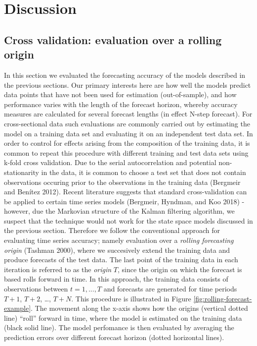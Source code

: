 \documentclass[]{article}
\begin{document}
\section{Discussion}\label{discussion}

\subsection{Cross validation: evaluation over a rolling
origin}\label{cross-validation-evaluation-over-a-rolling-origin}

In this section we evaluated the forecasting accuracy of the models
described in the previous sections. Our primary interests here are how
well the models predict data points that have not been used for
estimation (out-of-sample), and how performance varies with the length
of the forecast horizon, whereby accuracy measures are calculated for
several forecast lengths (in effect N-step forecast). For
cross-sectional data such evaluations are commonly carried out by
estimating the model on a training data set and evaluating it on an
independent test data set. In order to control for effects arising from
the composition of the training data, it is common to repeat this
procedure with different training and test data sets using k-fold cross
validation. Due to the serial autocorrelation and potential
non-stationarity in the data, it is common to choose a test set that
does not contain observations occuring prior to the observations in the
training data (Bergmeir and Benítez 2012). Recent literature suggests
that standard cross-validation can be applied to certain time series
models (Bergmeir, Hyndman, and Koo 2018) - however, due the Markovian
structure of the Kalman filtering algorithm, we suspect that the
technique would not work for the state space models discussed in the
previous section. Therefore we follow the conventional approach for
evaluating time series accuracy; namely evaluation over a
\textit{rolling forecasting origin} (Tashman 2000), where we succesively
extend the training data and produce forecasts of the test data. The
last point of the training data in each iteration is referred to as the
\textit{origin} \(T\), since the origin on which the forecast is based
rolls forward in time. In this approach, the training data consists of
observations between \(t = 1, ..., T\) and forecasts are generated for
time periods \(T+1\), \(T+2\), \ldots{}, \(T+N\). This procedure is
illustrated in Figure \ref{fig:rolling-forecast-example}. The movement
along the x-axis shows how the origins (vertical dotted line) ``roll''
forward in time, where the model is estimated on the training data
(black solid line). The model perfomance is then evaluated by averaging
the prediction errors over different forecast horizon (dotted horizontal
lines).
\end{document}
